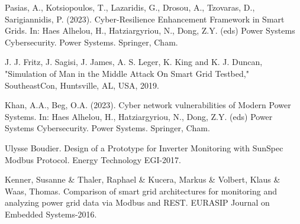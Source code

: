 \documentclass[letterpaper,10pt,conference]{IEEEtran}
\begin{document}
\begin{thebibliography}{00}
Pasias, A., Kotsiopoulos, T., Lazaridis, G., Drosou, A., Tzovaras, D., Sarigiannidis, P. (2023). Cyber-Resilience Enhancement Framework in Smart Grids. In: Haes Alhelou, H., Hatziargyriou, N., Dong, Z.Y. (eds) Power Systems Cybersecurity. Power Systems. Springer, Cham. 

J. J. Fritz, J. Sagisi, J. James, A. S. Leger, K. King and K. J. Duncan, "Simulation of Man in the Middle Attack On Smart Grid Testbed," SoutheastCon, Huntsville, AL, USA, 2019.

Khan, A.A., Beg, O.A. (2023). Cyber network vulnerabilities of Modern Power Systems. In: Haes Alhelou, H., Hatziargyriou, N., Dong, Z.Y. (eds) Power Systems Cybersecurity. Power Systems. Springer, Cham. 

Ulysse Boudier. Design of a Prototype for Inverter Monitoring
with SunSpec Modbus Protocol. Energy Technology EGI-2017.

Kenner, Susanne \& Thaler, Raphael & Kucera, Markus \& Volbert, Klaus \& Waas, Thomas. Comparison of smart grid architectures for monitoring and analyzing power grid data via Modbus and REST. EURASIP Journal on Embedded Systems-2016.


\end{thebibliography}
\end{document}
